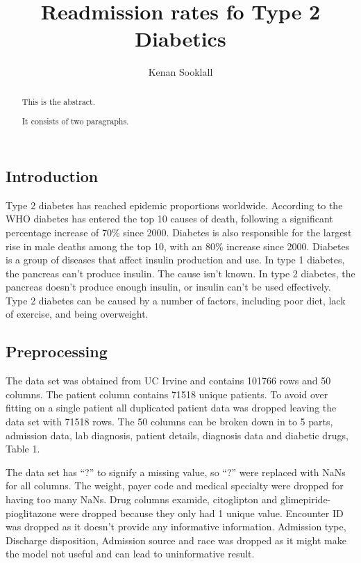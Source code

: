 \documentclass[5p]{elsarticle} %
\begin{document}
\begin{frontmatter}

  \title{Readmission rates fo Type 2 Diabetics}
    \author[CUNY-SPS]{Kenan Sooklall%
  }
  
  \begin{abstract}
  This is the abstract.

  It consists of two paragraphs.
  \end{abstract}
  
 \end{frontmatter}

\hypertarget{introduction}{%
\subsection{Introduction}\label{introduction}}

Type 2 diabetes has reached epidemic proportions worldwide. According to
the WHO diabetes has entered the top 10 causes of death, following a
significant percentage increase of 70\% since 2000. Diabetes is also
responsible for the largest rise in male deaths among the top 10, with
an 80\% increase since 2000. Diabetes is a group of diseases that affect
insulin production and use. In type 1 diabetes, the pancreas can't
produce insulin. The cause isn't known. In type 2 diabetes, the pancreas
doesn't produce enough insulin, or insulin can't be used effectively.
Type 2 diabetes can be caused by a number of factors, including poor
diet, lack of exercise, and being overweight.

\hypertarget{preprocessing}{%
\subsection{Preprocessing}\label{preprocessing}}

The data set was obtained from UC Irvine and contains 101766 rows and 50
columns. The patient column contains 71518 unique patients. To avoid
over fitting on a single patient all duplicated patient data was dropped
leaving the data set with 71518 rows. The 50 columns can be broken down
in to 5 parts, admission data, lab diagnosis, patient details, diagnosis
data and diabetic drugs, Table 1.

The data set has ``?'' to signify a missing value, so ``?'' were
replaced with NaNs for all columns. The weight, payer code and medical
specialty were dropped for having too many NaNs. Drug columns examide,
citoglipton and glimepiride-pioglitazone were dropped because they only
had 1 unique value. Encounter ID was dropped as it doesn't provide any
informative information. Admission type, Discharge disposition,
Admission source and race was dropped as it might make the model not
useful and can lead to uninformative result.
\end{document}

